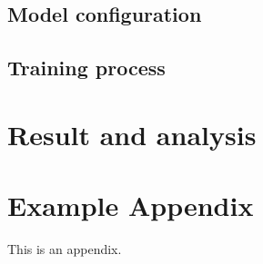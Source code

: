 \documentclass[11pt]{article}
\begin{document}
\subsection{Model configuration}\label{sec:model-config}

\subsection{Training process}\label{sec:training-process}

\section{Result and analysis}\label{sec:results-analysis}

\nocite{*}



\appendix

\section{Example Appendix}
\label{sec:appendix}

This is an appendix.
\end{document}
